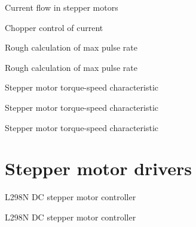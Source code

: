 \documentclass[compress]{beamer}
\begin{document}
{
    \begin{frame}{Current flow in stepper motors}
    \end{frame}
}

{
    \begin{frame}{Chopper control of current}
    \end{frame}
}

{
    \begin{frame}{Rough calculation of max pulse rate}
    \end{frame}
}

{
    \begin{frame}{Rough calculation of max pulse rate}
    \end{frame}
}

{
    \begin{frame}{Stepper motor torque-speed characteristic}
    \end{frame}
}

{
    \begin{frame}{Stepper motor torque-speed characteristic}
    \end{frame}
}

{
    \begin{frame}{Stepper motor torque-speed characteristic}
    \end{frame}
}

\section[Drivers]{Stepper motor drivers}

{
    \begin{frame}{L298N DC stepper motor controller}
    \end{frame}
}

{
    \begin{frame}{L298N DC stepper motor controller}
    \end{frame}
}
\end{document}
